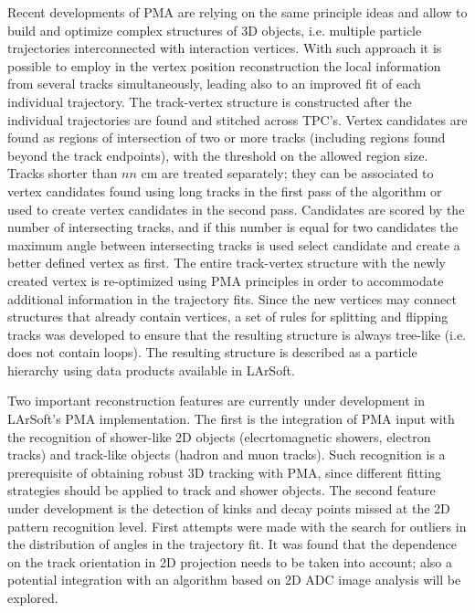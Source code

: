 Recent developments of PMA are relying on the same principle ideas and allow to build and optimize complex structures of 3D objects, i.e. multiple particle trajectories interconnected with interaction vertices. With such approach it is possible to employ in the vertex position reconstruction the local information from several tracks simultaneously, leading also to an improved fit of each individual trajectory. The track-vertex structure is constructed after the individual trajectories are found and stitched across TPC's. Vertex candidates are found as regions of intersection of two or more tracks (including regions found beyond the track endpoints), with the threshold on the allowed region size. Tracks shorter than $nn$ cm are treated separately; they can be associated to vertex candidates found using long tracks in the first pass of the algorithm or used to create vertex candidates in the second pass. Candidates are scored by the number of intersecting tracks, and if this number is equal for two candidates the maximum angle between intersecting tracks is used select candidate and create a better defined vertex as first. The entire track-vertex structure with the newly created vertex is re-optimized using PMA principles in order to accommodate additional information in the trajectory fits. Since the new vertices may connect structures that already contain vertices, a set of rules for splitting and flipping tracks was developed to ensure that the resulting structure is always tree-like (i.e. does not contain loops). The resulting structure is described as a particle hierarchy using data products available in LArSoft.


Two important reconstruction features are currently under development in LArSoft's PMA implementation. The first is the integration of PMA input with the recognition of shower-like 2D objects (elecrtomagnetic showers, electron tracks) and track-like objects (hadron and muon tracks). Such recognition is a prerequisite of obtaining robust 3D tracking with PMA, since different fitting strategies should be applied to track and shower objects. The second feature under development is the detection of kinks and decay points missed at the 2D pattern recognition level. First attempts were made with the search for outliers in the distribution of angles in the trajectory fit. It was found that the dependence on the track orientation in 2D projection needs to be taken into account; also a potential integration with an algorithm based on 2D ADC image analysis will be explored.



